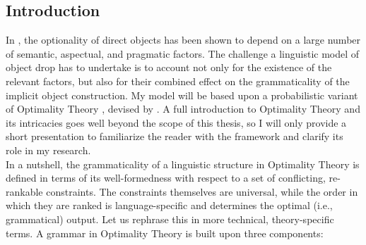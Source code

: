 \subsection{Introduction} In , the optionality of direct objects has been shown to depend on a large number of semantic, aspectual, and pragmatic factors. The challenge a linguistic model of object drop has to undertake is to account not only for the existence of the relevant factors, but also for their combined effect on the grammaticality of the implicit object construction. My model will be based upon a probabilistic variant of Optimality Theory \parencite{princesmolensky1993optimality, PrinceSmolensky2008, PrinceSmolensky1997otIntro}, devised by \textcite{Medina2007}. A full introduction to Optimality Theory and its intricacies goes well beyond the scope of this thesis, so I will only provide a short presentation to familiarize the reader with the framework and clarify its role in my research.\\ %
In a nutshell, the grammaticality of a linguistic structure in Optimality Theory is defined in terms of its well-formedness with respect to a set of conflicting, re-rankable constraints. The constraints themselves are universal, while the order in which they are ranked is language-specific and determines the optimal (i.e., grammatical) output. Let us rephrase this in more technical, theory-specific terms. A grammar in Optimality Theory is built upon three components:
